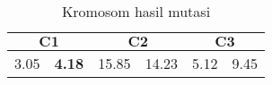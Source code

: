 \begin{table}[h]
	\centering
	\begin{tabular}{|c|c|c|c|c|c|}
		\multicolumn{2}{c}{\textbf{$\mathbf{C1}$}} & \multicolumn{2}{c}{\textbf{$\mathbf{C2}$}} & \multicolumn{2}{c}{$\mathbf{C3}$}\\ \hline
		3.05 & {\color{red} \textbf{4.18}} & 15.85 & 14.23 & 5.12 & 9.45\\ \hline
	\end{tabular}
	\caption{Kromosom hasil mutasi}
	\label{tbl:mutated}
\end{table}


%
